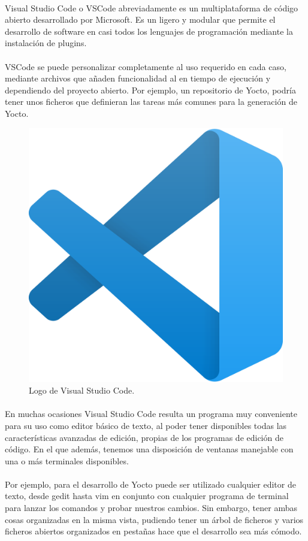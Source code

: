 \paragraph{}Visual Studio Code o VSCode abreviadamente es un  multiplataforma
de código abierto desarrollado por Microsoft. Es un  ligero y modular
que permite el desarrollo de software en casi todos los lenguajes de programación mediante
la instalación de \gls{plugins}.

\paragraph{}VSCode se puede personalizar completamente al uso requerido en cada caso,
mediante archivos que añaden funcionalidad al  en tiempo de ejecución
y dependiendo del proyecto abierto. Por ejemplo, un repositorio de Yocto, podría tener unos
ficheros que definieran las tareas más comunes para la generación de Yocto.

\begin{figure}[H]
	\centering
	\includegraphics[width=0.30\linewidth]{imgs/vscode-logo}
	\caption[Visual Studio Code]{Logo de Visual Studio Code.}
	\label{fig:vscode-log}
\end{figure}

\paragraph{}En muchas ocasiones Visual Studio Code resulta un programa muy conveniente
para su uso como editor básico de texto, al poder tener disponibles todas las características
avanzadas de edición, propias de los programas de edición de código. En el que además,
tenemos una disposición de ventanas manejable con una o más terminales disponibles.

\paragraph{}Por ejemplo, para el desarrollo de Yocto puede ser utilizado cualquier editor
de texto, desde gedit hasta vim en conjunto con cualquier programa de terminal para lanzar los
comandos y probar nuestros cambios. Sin embargo, tener ambas cosas organizadas en la misma
vista, pudiendo tener un árbol de ficheros y varios ficheros abiertos organizados en pestañas
hace que el desarrollo sea más cómodo.


